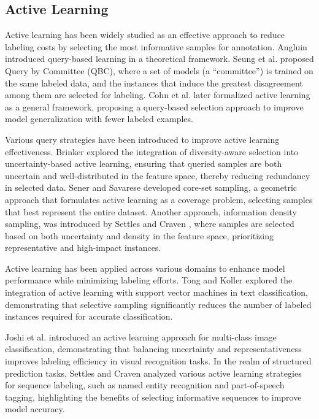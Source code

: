 \subsection{Active Learning}


Active learning has been widely studied as an effective approach to reduce labeling costs by selecting the most informative samples for annotation. Angluin \cite{angluin1988queries} introduced query-based learning in a theoretical framework. Seung et al. \cite{QBC} proposed Query by Committee (QBC), where a set of models (a “committee”) is trained on the same labeled data, and the instances that induce the greatest disagreement among them are selected for labeling. Cohn et al. \cite{cohn1994improving} later formalized active learning as a general framework, proposing a query-based selection approach to improve model generalization with fewer labeled examples.

Various query strategies have been introduced to improve active learning effectiveness. Brinker \cite{10.5555/3041838.3041846} explored the integration of diversity-aware selection into uncertainty-based active learning, ensuring that queried samples are both uncertain and well-distributed in the feature space, thereby reducing redundancy in selected data. Sener and Savarese \cite{sener2018active} developed core-set sampling, a geometric approach that formulates active learning as a coverage problem, selecting samples that best represent the entire dataset. Another approach, information density sampling, was introduced by Settles and Craven \cite{settles-craven-2008-analysis}, where samples are selected based on both uncertainty and density in the feature space, prioritizing representative and high-impact instances.

Active learning has been applied across various domains to enhance model performance while minimizing labeling efforts. Tong and Koller \cite{tong2002support} explored the integration of active learning with support vector machines in text classification, demonstrating that selective sampling significantly reduces the number of labeled instances required for accurate classification. 

Joshi et al.\cite{5206627} introduced an active learning approach for multi-class image classification, demonstrating that balancing uncertainty and representativeness improves labeling efficiency in visual recognition tasks. In the realm of structured prediction tasks, Settles and Craven \cite{settles-craven-2008-analysis} analyzed various active learning strategies for sequence labeling, such as named entity recognition and part-of-speech tagging, highlighting the benefits of selecting informative sequences to improve model accuracy.
